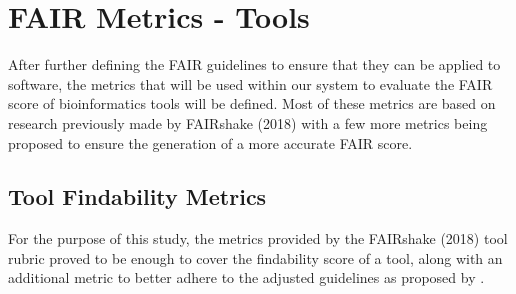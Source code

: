 \documentclass{cisfyp}
\begin{document}
\section{FAIR Metrics - Tools}
After further defining the FAIR guidelines to ensure that they can be applied to software, the metrics that will be used within our system to evaluate the FAIR score of bioinformatics tools will be defined. Most of these metrics are based on research previously made by FAIRshake (2018) with a few more metrics being proposed to ensure the generation of a more accurate FAIR score.

\subsection{Tool Findability Metrics}
For the purpose of this study, the metrics provided by the FAIRshake (2018) tool rubric proved to be enough to cover the findability score of a tool, along with an additional metric to better adhere to the adjusted guidelines as proposed by \cite{dbcls}.
\end{document}
